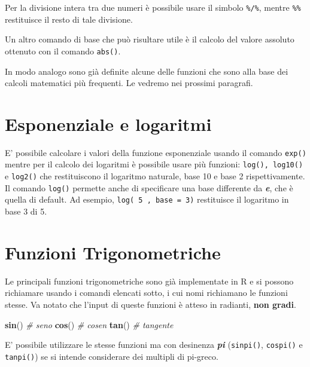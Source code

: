 \documentclass[]{book}
\newenvironment{Shaded}{\begin{snugshade}}{\end{snugshade}}
\newcommand{\CommentTok}[1]{\textcolor[rgb]{0.56,0.35,0.01}{\textit{#1}}}
\newcommand{\KeywordTok}[1]{\textcolor[rgb]{0.13,0.29,0.53}{\textbf{#1}}}
\newcommand{\NormalTok}[1]{#1}
\begin{document}
Per la divisione intera tra due numeri è possibile usare il simbolo \texttt{\%/\%}, mentre \texttt{\%\%} restituisce il resto di tale divisione.

Un altro comando di base che può risultare utile è il calcolo del valore assoluto ottenuto con il comando \texttt{abs()}.

In modo analogo sono già definite alcune delle funzioni che sono alla base dei calcoli matematici più frequenti. Le vedremo nei prossimi paragrafi.

\hypertarget{esponenziale-e-logaritmi}{%
\section{Esponenziale e logaritmi}\label{esponenziale-e-logaritmi}}

E' possibile calcolare i valori della funzione esponenziale usando il comando \texttt{exp()} mentre per il calcolo dei logaritmi è possibile usare più funzioni:
\texttt{log(),\ log10()} e \texttt{log2()} che restituiscono il logaritmo naturale, base 10 e base 2 rispettivamente. Il comando \texttt{log()} permette anche di specificare una base differente da \textbf{\emph{e}}, che è quella di default. Ad esempio, \texttt{log(\ 5\ ,\ base\ =\ 3)} restituisce il logaritmo in base 3 di 5.

\hypertarget{funzioni-trigonometriche}{%
\section{Funzioni Trigonometriche}\label{funzioni-trigonometriche}}

Le principali funzioni trigonometriche sono già implementate in R e si possono richiamare usando i comandi elencati sotto, i cui nomi richiamano le funzioni stesse. Va notato che l'input di queste funzioni è atteso in radianti, \textbf{non gradi}.

\begin{Shaded}
\begin{Highlighting}[]
\KeywordTok{sin}\NormalTok{() }\CommentTok{# seno}
\KeywordTok{cos}\NormalTok{() }\CommentTok{# cosen}
\KeywordTok{tan}\NormalTok{() }\CommentTok{# tangente}
\end{Highlighting}
\end{Shaded}

E' possibile utilizzare le stesse funzioni ma con desinenza \textbf{\emph{pi}} (\texttt{sinpi()}, \texttt{cospi()} e \texttt{tanpi()}) se si intende considerare dei multipli di pi-greco.
\end{document}
